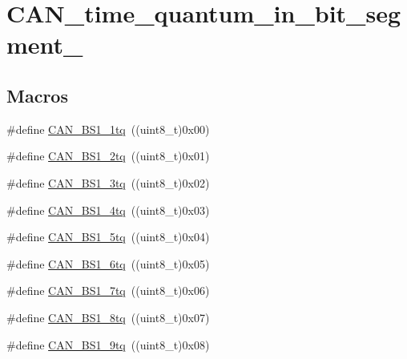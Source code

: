 \hypertarget{group___c_a_n__time__quantum__in__bit__segment__1}{}\section{C\+A\+N\+\_\+time\+\_\+quantum\+\_\+in\+\_\+bit\+\_\+segment\+\_}
\label{group___c_a_n__time__quantum__in__bit__segment__1}
\subsection*{Macros}
\begin{DoxyCompactItemize}
\item 
\#define \mbox{\hyperlink{group___c_a_n__time__quantum__in__bit__segment__1_ga76b8fb0815b7a3f398fffe72dda0bc04}{C\+A\+N\+\_\+\+B\+S1\+\_\+1tq}}~((uint8\+\_\+t)0x00)
\item 
\#define \mbox{\hyperlink{group___c_a_n__time__quantum__in__bit__segment__1_ga1544ecf902e6173859d60cff9530971a}{C\+A\+N\+\_\+\+B\+S1\+\_\+2tq}}~((uint8\+\_\+t)0x01)
\item 
\#define \mbox{\hyperlink{group___c_a_n__time__quantum__in__bit__segment__1_gaa808099663480de935d3ce9187c2dcab}{C\+A\+N\+\_\+\+B\+S1\+\_\+3tq}}~((uint8\+\_\+t)0x02)
\item 
\#define \mbox{\hyperlink{group___c_a_n__time__quantum__in__bit__segment__1_ga7c5c668200f41991e14b31ca20235000}{C\+A\+N\+\_\+\+B\+S1\+\_\+4tq}}~((uint8\+\_\+t)0x03)
\item 
\#define \mbox{\hyperlink{group___c_a_n__time__quantum__in__bit__segment__1_ga31dea95492dababfcf79bcaeb884b99e}{C\+A\+N\+\_\+\+B\+S1\+\_\+5tq}}~((uint8\+\_\+t)0x04)
\item 
\#define \mbox{\hyperlink{group___c_a_n__time__quantum__in__bit__segment__1_gaa7fc6fcdf9c1c70ee9700b35e32e205e}{C\+A\+N\+\_\+\+B\+S1\+\_\+6tq}}~((uint8\+\_\+t)0x05)
\item 
\#define \mbox{\hyperlink{group___c_a_n__time__quantum__in__bit__segment__1_gafec90578d657073a671b6326f3bfcf8e}{C\+A\+N\+\_\+\+B\+S1\+\_\+7tq}}~((uint8\+\_\+t)0x06)
\item 
\#define \mbox{\hyperlink{group___c_a_n__time__quantum__in__bit__segment__1_ga1049ea9bc5b3da680574ca444e888de4}{C\+A\+N\+\_\+\+B\+S1\+\_\+8tq}}~((uint8\+\_\+t)0x07)
\item 
\#define \mbox{\hyperlink{group___c_a_n__time__quantum__in__bit__segment__1_ga0493701bdd73a9649510f035439a6580}{C\+A\+N\+\_\+\+B\+S1\+\_\+9tq}}~((uint8\+\_\+t)0x08)

\end{DoxyCompactItemize}

